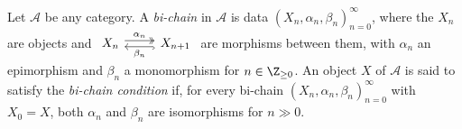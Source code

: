 \begin{definition}\label{def:bichain}
	Let $\mathcal{A}$ be any category. A \emph{bi-chain} in $\mathcal{A}$ is
	data $(X_n,\alpha_n,\beta_n)_{n=0}^\infty$, where the $X_n$ are objects
	and
	$\begin{tikzcd}
		X_n \arrow[twoheadrightarrow, r, shift left, "\alpha_n"] & X_{n+1} \arrow[hookrightarrow, l, shift left, "\beta_n"]
	\end{tikzcd}$
	are morphisms between them, with $\alpha_n$ an epimorphism and $\beta_n$ a
	monomorphism for $n\in\Z_{\geq0}$. An object $X$ of $\mathcal{A}$ is said
	to satisfy the \emph{bi-chain condition} if, for every bi-chain
	$(X_n,\alpha_n,\beta_n)_{n=0}^\infty$ with $X_0=X$, both $\alpha_n$ and
	$\beta_n$ are isomorphisms for $n\gg0$.
\end{definition}

